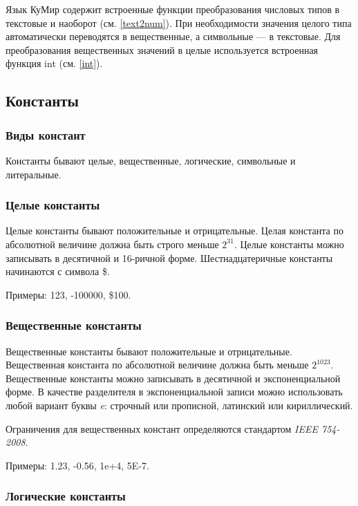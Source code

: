 \documentclass[12pt,a4paper]{article}
\begin{document}
Язык КуМир содержит встроенные функции преобразования числовых типов в текстовые и наоборот (см. \ref{text2num}).  При необходимости значения целого типа автоматически переводятся в вещественные, а символьные --- в текстовые. Для преобразования вещественных значений в целые используется встроенная функция \textsf{int} (см. \ref{int}).


\subsection{Константы}

\subsubsection{Виды констант}

	Константы бывают целые, вещественные, логические, символьные и литеральные.
 
\subsubsection{Целые константы}

Целые константы бывают положительные и отрицательные. Целая константа по абсолютной величине должна быть строго меньше $2^{31}$. Целые константы можно записывать в десятичной и 16-ричной форме. Шестнадцатеричные константы начинаются с символа \$.

Примеры: \textsf{123, -100000, \$100}.

\subsubsection{Вещественные константы}

Вещественные константы бывают положительные и отрицательные. Вещественная константа по абсолютной величине должна быть меньше $2^{1023}$. Вещественные константы можно записывать в десятичной и экспоненциальной форме. В качестве разделителя в экспоненциальной записи можно использовать любой вариант буквы \emph{e}: строчный или прописной, латинский или кириллический.

Ограничения для вещественных констант определяются стандартом \emph{IEEE 754-2008}.

Примеры: \textsf{1.23, -0.56, 1e+4, 5E-7}.

\subsubsection{Логические константы}
\end{document}

